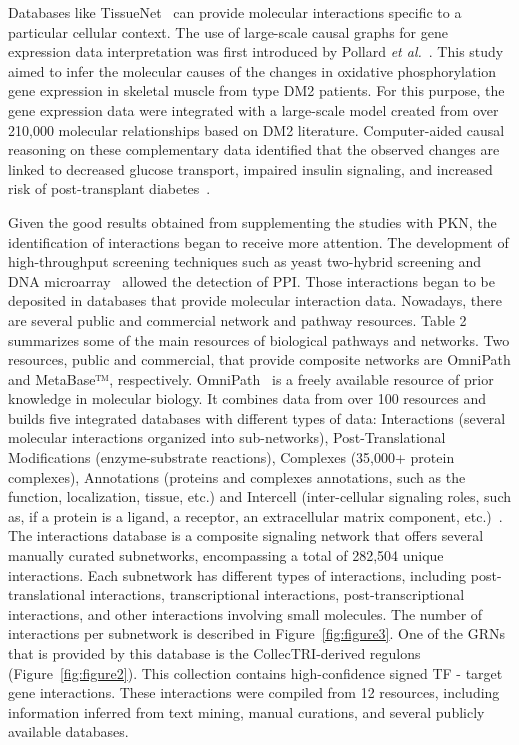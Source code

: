 Databases like TissueNet~\cite{RN137} can provide molecular interactions specific to a particular cellular context. The use of large-scale causal graphs for gene expression data interpretation was first introduced by Pollard \textit{et al.}~\cite{RN131, RN135}. This study aimed to infer the molecular causes of the changes in oxidative phosphorylation gene expression in skeletal muscle from type \gls{DM2} patients. For this purpose, the gene expression data were integrated with a large-scale model created from over 210,000 molecular relationships based on \gls{DM2} literature. 
Computer-aided causal reasoning on these complementary data identified that the observed changes are linked to decreased glucose transport, impaired insulin signaling, and increased risk of post-transplant diabetes~\cite{RN131}.


Given the good results obtained from supplementing the studies with PKN, the identification of interactions began to receive more attention. 
The development of high-throughput screening techniques such as yeast two-hybrid screening and DNA microarray~\cite{RN138} allowed the detection of PPI. 
Those interactions began to be deposited in databases that provide molecular interaction data. 
Nowadays, there are several public and commercial network and pathway resources. Table 2 summarizes some of the main resources of biological pathways and networks. 
Two resources, public and commercial, that provide composite networks are OmniPath and MetaBase™, respectively. OmniPath~\cite{RN91} is a freely available resource of prior knowledge in molecular biology. 
It combines data from over 100 resources and builds five integrated databases with different types of data: Interactions (several molecular interactions organized into sub-networks), Post-Translational Modifications (enzyme-substrate reactions), Complexes (35,000+ protein complexes), Annotations (proteins and complexes annotations, such as the function, localization, tissue, etc.) and Intercell (inter-cellular signaling roles, such as, if a protein is a ligand, a receptor, an extracellular matrix component,  etc.)~\cite{RN91}. 
The interactions database is a composite signaling network that offers several manually curated subnetworks, encompassing a total of 282,504 unique interactions. 
Each subnetwork has different types of interactions, including post-translational interactions, transcriptional interactions, post-transcriptional interactions, and other interactions involving small molecules. 
The number of interactions per subnetwork is described in Figure~\ref{fig:figure3}. One of the GRNs that is provided by this database is the CollecTRI-derived regulons~\cite{RN145} (Figure~\ref{fig:figure2}). 
This collection contains high-confidence signed \gls{TF} - target gene interactions. 
These interactions were compiled from 12 resources, including information inferred from text mining, manual curations, and several publicly available databases.

